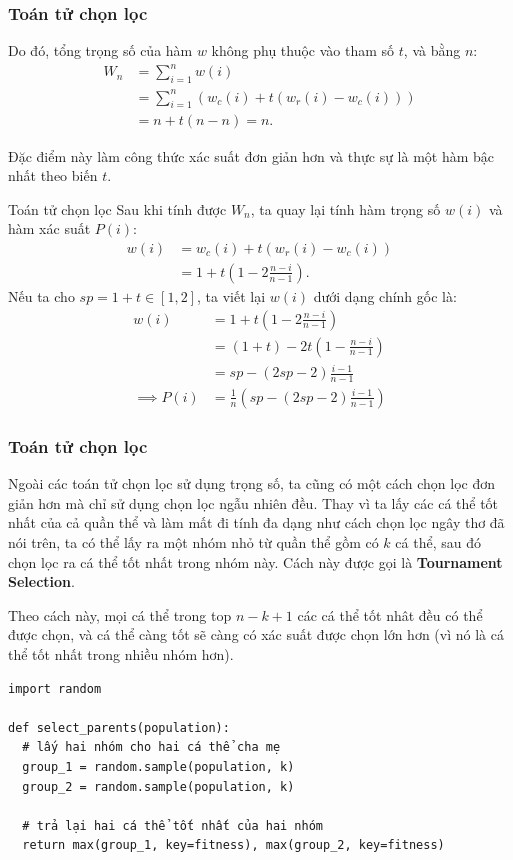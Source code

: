 \begin{frame}
\frametitle{Toán tử chọn lọc}
  Do đó, tổng trọng số của hàm $w$ không phụ thuộc vào tham số $t$, và bằng $n$:
  \begin{align*}
    W_{n} &= \sum_{i = 1}^{n} w(i)\\
    &= \sum_{i = 1}^{n} \left( w_{c}(i) + t(w_{r}(i) - w_{c}(i)) \right)  \\
    &= n + t (n - n) = n.
  \end{align*}

  Đặc điểm này làm công thức xác suất đơn giản hơn và thực sự là một hàm bậc
  nhất theo biến $t$.
\end{frame}

\begin{frame}{Toán tử chọn lọc}
  Sau khi tính được $W_{n}$, ta quay lại tính hàm trọng số $w(i)$ và hàm xác
  suất $P(i)$:
  \begin{align*}
    w(i) &= w_{c}(i) + t(w_{r}(i) - w_{c}(i))\\
    &= 1 + t \left( 1 - 2\frac{n - i}{n - 1} \right)
  .\end{align*}
  Nếu ta cho \( sp = 1 + t \in [1, 2]  \), ta viết lại \( w(i) \) dưới dạng
  chính gốc là:
  \begin{align*}
    w(i)
    &= 1 + t \left( 1 - 2\frac{n - i}{n - 1} \right)\\
    &= (1 + t) - 2t \left( 1 - \frac{n - i}{n - 1} \right)  \\
    &= sp - (2sp - 2) \frac{i - 1}{n - 1}\\
    \implies P(i) &= \frac{1}{n} \left( sp - (2sp - 2) \frac{i - 1}{n - 1} \right) 
  \end{align*}
\end{frame}

\begin{frame}[fragile]
\frametitle{Toán tử chọn lọc}
  Ngoài các toán tử chọn lọc sử dụng trọng số, ta cũng có một cách chọn lọc đơn
  giản hơn mà chỉ sử dụng chọn lọc ngẫu nhiên đều. Thay vì ta lấy các cá thể tốt
  nhất của cả quần thể và làm mất đi tính đa dạng như cách chọn lọc ngây thơ đã
  nói trên, ta có thể lấy ra một nhóm nhỏ từ quần thể gồm có \( k \) cá thể, sau đó
  chọn lọc ra cá thể tốt nhất trong nhóm này. Cách này được gọi là
  \textbf{Tournament Selection}.

  Theo cách này, mọi cá thể trong top \( n - k + 1 \) các cá thể tốt nhât đều có
  thể được chọn, và cá thể càng tốt sẽ càng có xác suất được chọn lớn hơn (vì nó
  là cá thể tốt nhất trong nhiều nhóm hơn).
  \begin{verbatim}
import random

def select_parents(population):
  # lấy hai nhóm cho hai cá thể cha mẹ
  group_1 = random.sample(population, k)
  group_2 = random.sample(population, k)

  # trả lại hai cá thể tốt nhất của hai nhóm
  return max(group_1, key=fitness), max(group_2, key=fitness)
  \end{verbatim}
\end{frame}

